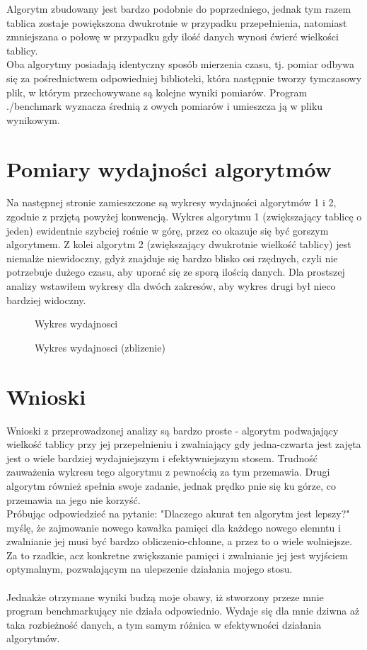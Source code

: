 \documentclass[a4paper,12pt]{article}
\begin{document}
Algorytm zbudowany jest bardzo podobnie do poprzedniego, jednak tym razem 
tablica zostaje powiększona dwukrotnie w przypadku przepełnienia, natomiast
zmniejszana o połowę w przypadku gdy ilość danych wynosi ćwierć wielkości
tablicy.\\

Oba algorytmy posiadają identyczny sposób mierzenia czasu, tj. pomiar odbywa
 się za pośrednictwem odpowiedniej biblioteki, która następnie tworzy
tymczasowy plik, w którym przechowywane są kolejne wyniki pomiarów. Program
./benchmark wyznacza średnią z owych pomiarów i umieszcza ją w pliku 
wynikowym.

\section{Pomiary wydajności algorytmów}

Na następnej stronie zamieszczone są wykresy wydajności algorytmów 1 i 2, zgodnie z przjętą
powyżej konwencją. Wykres algorytmu 1 (zwiększający tablicę o jeden) ewidentnie
szybciej rośnie w górę, przez co okazuje się być gorszym algorytmem. Z kolei
algorytm 2 (zwiększający dwukrotnie wielkość tablicy) jest niemalże niewidoczny,
gdyż znajduje się bardzo blisko osi rzędnych, czyli nie potrzebuje dużego
czasu, aby uporać się ze sporą ilością danych. Dla prostszej analizy wstawiłem
wykresy dla dwóch zakresów, aby wykres drugi był nieco bardziej widoczny.

\begin{figure}[hb]

\caption{Wykres wydajnosci}


\caption{Wykres wydajnosci (zblizenie)}
\end{figure}

\section{Wnioski}

Wnioski z przeprowadzonej analizy są bardzo proste - algorytm podwajający wielkość
tablicy przy jej przepełnieniu i zwalniający gdy jedna-czwarta jest zajęta
jest o wiele bardziej wydajniejszym i efektywniejszym stosem. Trudność zauważenia
wykresu tego algorytmu z pewnością za tym przemawia. Drugi algorytm również
spełnia swoje zadanie, jednak prędko pnie się ku górze, co przemawia na jego 
nie korzyść. \\
Próbując odpowiedzieć na pytanie: "Dlaczego akurat ten algorytm jest lepszy?"
myślę, że zajmowanie nowego kawałka pamięci dla każdego nowego elemntu i
zwalnianie jej musi być bardzo obliczenio-chłonne, a przez to o wiele wolniejsze.
Za to rzadkie, acz konkretne zwiększanie pamięci i zwalnianie jej jest wyjściem
optymalnym, pozwalającym na ulepszenie działania mojego stosu.\\\\
Jednakże otrzymane wyniki budzą moje obawy, iż stworzony przeze mnie program
benchmarkujący nie działa odpowiednio. Wydaje się dla mnie dziwna aż taka
rozbieżność danych, a tym samym różnica w efektywności działania algorytmów.
\end{document}
